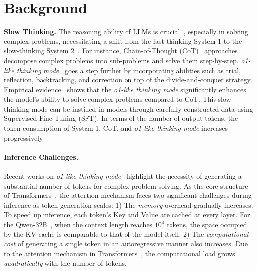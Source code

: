 \section{Background}

\textbf{Slow Thinking.}
The reasoning ability of LLMs is crucial~\citep{acl23_reason_survey}, especially in solving complex problems, necessitating a shift from the fast-thinking System 1 to the slow-thinking System 2~\citep{pb96_system12,fsg11_thinking_fast_slow,aaai21_machine_fast_slow}. 
For instance, Chain-of-Thought (CoT)~\citep{nips22_cot} approaches decompose complex problems into sub-problems and solve them step-by-step. 
\textit{o1-like thinking mode}~\citep{arixv24_o1,arxiv24_qwq,arxiv25_deepseek_r1} goes a step further by incorporating abilities such as trial, reflection, backtracking, and correction on top of the divide-and-conquer strategy. 
Empirical evidence~\citep{arixv24_o1,arxiv25_deepseek_r1} shows that the \textit{o1-like thinking mode} significantly enhances the model's ability to solve complex problems compared to CoT. 
This slow-thinking mode can be instilled in models through carefully constructed data using Supervised Fine-Tuning (SFT). 
In terms of the number of output tokens, the token consumption of System 1, CoT, and \textit{o1-like thinking mode} increases progressively.

\paragraph{Inference Challenges.}
Recent works on \textit{o1-like thinking mode}~\citep{arxiv24_o1_study} 
highlight the necessity of generating a substantial number of tokens for complex problem-solving.
As the core structure of Transformers~\citep{nips17_transformer}, the attention mechanism faces two significant challenges during inference as token generation scales:
1) The \textit{memory} overhead gradually increases. 
To speed up inference, each token's Key and Value are cached at every layer. 
For the Qwen-32B~\citep{arxiv24_qwen2_5}, when the context length reaches $10^4$ tokens, the space occupied by the KV cache is comparable to that of the model itself.
2) The \textit{computational cost} of generating a single token in an autoregressive manner also increases. 
Due to the attention mechanism in Transformers~\citep{nips17_transformer}, the computational load grows \textit{quadratically} with the number of tokens.
